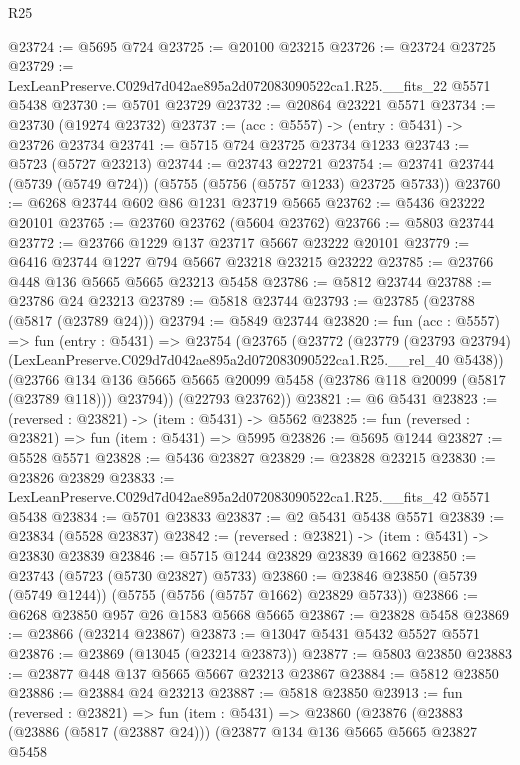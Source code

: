 \begin{lexlean}{R25}
\begin{coremodule}
@23724 := @5695 @724
@23725 := @20100 @23215
@23726 := @23724 @23725
@23729 := LexLeanPreserve.C029d7d042ae895a2d072083090522ca1.R25.__fits_22 @5571 @5438
@23730 := @5701 @23729
@23732 := @20864 @23221 @5571
@23734 := @23730 (@19274 @23732)
@23737 := (acc : @5557) -> (entry : @5431) -> @23726 @23734
@23741 := @5715 @724 @23725 @23734 @1233
@23743 := @5723 (@5727 @23213)
@23744 := @23743 @22721
@23754 := @23741 @23744 (@5739 (@5749 @724)) (@5755 (@5756 (@5757 @1233) @23725 @5733))
@23760 := @6268 @23744 @602 @86 @1231 @23719 @5665
@23762 := @5436 @23222 @20101
@23765 := @23760 @23762 (@5604 @23762)
@23766 := @5803 @23744
@23772 := @23766 @1229 @137 @23717 @5667 @23222 @20101
@23779 := @6416 @23744 @1227 @794 @5667 @23218 @23215 @23222
@23785 := @23766 @448 @136 @5665 @5665 @23213 @5458
@23786 := @5812 @23744
@23788 := @23786 @24 @23213
@23789 := @5818 @23744
@23793 := @23785 (@23788 (@5817 (@23789 @24)))
@23794 := @5849 @23744
@23820 := fun (acc : @5557) =>
  fun (entry : @5431) =>
  @23754
    (@23765
      (@23772
        (@23779
          (@23793 @23794)
          (LexLeanPreserve.C029d7d042ae895a2d072083090522ca1.R25.__rel_40 @5438))
        (@23766
          @134
          @136
          @5665
          @5665
          @20099
          @5458
          (@23786 @118 @20099 (@5817 (@23789 @118)))
          @23794))
      (@22793 @23762))
@23821 := @6 @5431
@23823 := (reversed : @23821) -> (item : @5431) -> @5562
@23825 := fun (reversed : @23821) => fun (item : @5431) => @5995
@23826 := @5695 @1244
@23827 := @5528 @5571
@23828 := @5436 @23827
@23829 := @23828 @23215
@23830 := @23826 @23829
@23833 := LexLeanPreserve.C029d7d042ae895a2d072083090522ca1.R25.__fits_42 @5571 @5438
@23834 := @5701 @23833
@23837 := @2 @5431 @5438 @5571
@23839 := @23834 (@5528 @23837)
@23842 := (reversed : @23821) -> (item : @5431) -> @23830 @23839
@23846 := @5715 @1244 @23829 @23839 @1662
@23850 := @23743 (@5723 (@5730 @23827) @5733)
@23860 := @23846 @23850 (@5739 (@5749 @1244)) (@5755 (@5756 (@5757 @1662) @23829 @5733))
@23866 := @6268 @23850 @957 @26 @1583 @5668 @5665
@23867 := @23828 @5458
@23869 := @23866 (@23214 @23867)
@23873 := @13047 @5431 @5432 @5527 @5571
@23876 := @23869 (@13045 (@23214 @23873))
@23877 := @5803 @23850
@23883 := @23877 @448 @137 @5665 @5667 @23213 @23867
@23884 := @5812 @23850
@23886 := @23884 @24 @23213
@23887 := @5818 @23850
@23913 := fun (reversed : @23821) =>
  fun (item : @5431) =>
  @23860
    (@23876
      (@23883
        (@23886 (@5817 (@23887 @24)))
        (@23877
          @134
          @136
          @5665
          @5665
          @23827
          @5458

\end{coremodule}
\end{lexlean}
